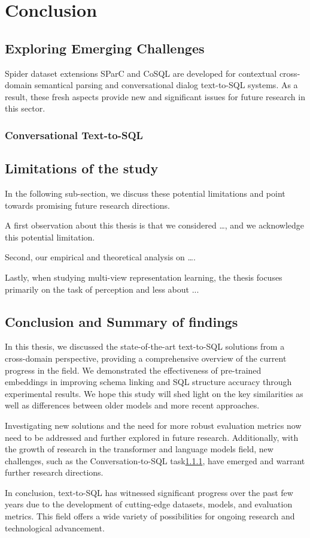 \section{Conclusion}

\subsection{Exploring Emerging Challenges}

Spider dataset extensions SParC and CoSQL are developed for contextual cross-domain semantical parsing and conversational dialog text-to-SQL systems.
As a result, these fresh aspects provide new and significant issues for future research in this sector.

\subsubsection{Conversational Text-to-SQL} \label{sec:conv}





\subsection{Limitations of the study}

In the following sub-section, we discuss these potential limitations and point towards promising future research directions.

A first observation about this thesis is that we considered …, and we acknowledge this potential limitation.

Second, our empirical and theoretical analysis on ….

Lastly, when studying multi-view representation learning, the thesis focuses primarily on the task of perception and less about ...

\subsection{Conclusion and Summary of findings}

In this thesis, we discussed the state-of-the-art text-to-SQL solutions from a cross-domain perspective, providing a comprehensive overview of the current progress in the field. We demonstrated the effectiveness of pre-trained embeddings in improving schema linking and SQL structure accuracy through experimental results. We hope this study will shed light on the key similarities as well as differences between older models and more recent approaches.

Investigating new solutions and the need for more robust evaluation metrics now need to be addressed and further explored in future research. Additionally, with the growth of research in the transformer and language models field, new challenges, such as the Conversation-to-SQL task\ref{sec:conv}, have emerged and warrant further research directions.

In conclusion, text-to-SQL has witnessed significant progress over the past few years due to the development of cutting-edge datasets, models, and evaluation metrics. This field offers a wide variety of possibilities for ongoing research and technological advancement.